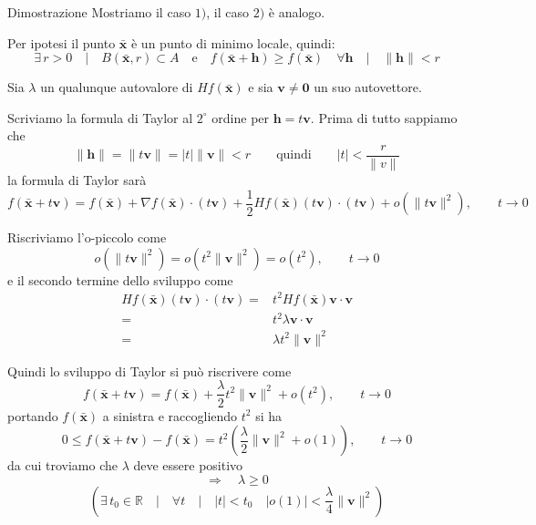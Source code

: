 \documentclass[x11names]{article}
\begin{document}
	\begin{es}{Dimostrazione}
		Mostriamo il caso \(1)\), il caso \(2)\) è analogo.
		
		Per ipotesi il punto \(\boldsymbol{\bar{x}}\) è un punto di minimo locale, quindi:
		\[ 
		\exists \,r > 0 \quad | \quad B(\boldsymbol{\bar{x}},r) \subset A \quad \text{e} \quad f(\boldsymbol{\bar{x}} + \boldsymbol{h}) \geq f(\boldsymbol{\bar{x}}) \quad \forall \boldsymbol{h} \quad|\quad \|\boldsymbol{h}\|<r
		\]
		
		Sia \(\lambda\) un qualunque autovalore di \(Hf(\boldsymbol{\bar{x}})\) e sia \(\boldsymbol{v} \neq \boldsymbol{0}\) un suo autovettore.
		
		Scriviamo la formula di Taylor al \(2^\circ\) ordine per \(\boldsymbol{h} = t\boldsymbol{v}\). Prima di tutto sappiamo che
		\[ 
		\|\boldsymbol{h}\| = \|t\boldsymbol{v}\| = |t|\|\boldsymbol{v}\| < r \qquad \text{quindi}\qquad |t| < \frac{r}{\|v\|}
		\]
		la formula di Taylor sarà
		\[ 
		f(\boldsymbol{\bar{x}} + t\boldsymbol{v}) = f(\boldsymbol{\bar{x}}) + \nabla f(\boldsymbol{\bar{x}})\cdot (t\boldsymbol{v}) + \frac{1}{2}Hf(\boldsymbol{\bar{x}})(t\boldsymbol{v})\cdot(t\boldsymbol{v}) + o(\|t\boldsymbol{v}\|^2),\qquad t\to 0
		\]
		
		Riscriviamo l'o-piccolo come
		\[ 
		o(\|t\boldsymbol{v}\|^2) = o(t^2\|\boldsymbol{v}\|^2) = o(t^2),\qquad t\to 0
		\]
		e il secondo termine dello sviluppo come 
		\begin{align*}
			Hf(\boldsymbol{\bar{x}})(t\boldsymbol{v})\cdot(t\boldsymbol{v}) =& t^2Hf(\boldsymbol{\bar{x}})\boldsymbol{v}\cdot\boldsymbol{v}\\ =& t^2\lambda \boldsymbol{v} \cdot \boldsymbol{v} \\
			=& \lambda t^2 \|\boldsymbol{v}\|^2
		\end{align*}
		
		Quindi lo sviluppo di Taylor si può riscrivere come
		\[ 
		f(\boldsymbol{\bar{x}} + t\boldsymbol{v}) = f(\boldsymbol{\bar{x}}) + \frac{\lambda}{2}t^2 \|\boldsymbol{v}\|^2 + o(t^2), \qquad t\to 0
		\]
		portando \(f(\boldsymbol{\bar{x}})\) a sinistra e raccogliendo \(t^2\) si ha
		\[ 
		0\leq f(\boldsymbol{\bar{x}} + t\boldsymbol{v}) - f(\boldsymbol{\bar{x}}) = t^2 \left(\frac{\lambda}{2} \|\boldsymbol{v}\|^2 + o(1)\right), \qquad t\to 0
		\]
		da cui troviamo che \(\lambda\) deve essere positivo
		\[ 
		\Longrightarrow \quad \lambda \geq 0
		\]
		\[ 
		\left(\exists \,t_{0} \in \mathbb{R} \quad | \quad \forall t \quad|\quad |t| < t_{0} \quad |o(1)| < \frac{\lambda}{4}\|\boldsymbol{v}\|^2\right)
		\]
		
	\end{es}
	
\end{document}
